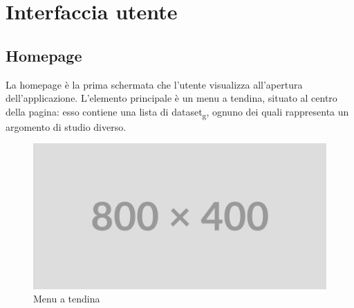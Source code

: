 \section{Interfaccia utente}

\subsection{Homepage}
La homepage è la prima schermata che l'utente visualizza all'apertura
dell'applicazione. L'elemento principale è un menu a tendina, situato al centro
della pagina: esso contiene una lista di dataset\textsubscript{g}, ognuno dei quali rappresenta
un argomento di studio diverso.
\begin{figure}[ht!]
    \centering
    \includegraphics[scale=0.6]{template/images/placeholder.png}
    \caption{Menu a tendina}
\end{figure}

